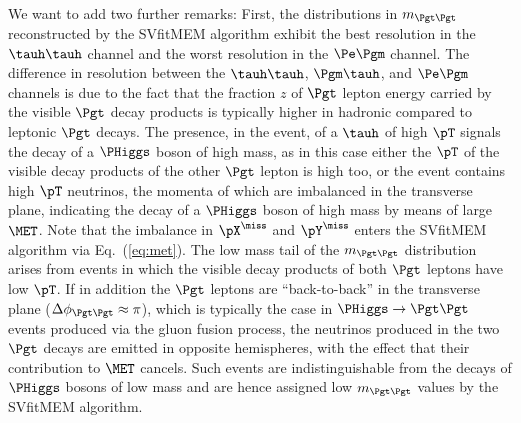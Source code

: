 We want to add two further remarks:
First, the distributions in $m_{\Pgt\Pgt}$ reconstructed by the SVfitMEM algorithm 
exhibit the best resolution in the $\tauh\tauh$ channel and the worst resolution in the $\Pe\Pgm$ channel.
The difference in resolution between the $\tauh\tauh$, $\Pgm\tauh$, and $\Pe\Pgm$ channels
is due to the fact that the fraction $z$ of $\Pgt$ lepton energy carried by the visible $\Pgt$ decay
products is typically higher in hadronic compared to leptonic $\Pgt$ decays.
The presence, in the event, of a $\tauh$ of high $\pT$ signals the decay of a
$\PHiggs$ boson of high mass,
as in this case either the $\pT$ of the visible decay products of the
other $\Pgt$ lepton is high too,
or the event contains high $\pT$ neutrinos, the momenta of which are imbalanced in the transverse plane,
indicating the decay of a $\PHiggs$ boson of high mass  by means of large $\MET$.
Note that the imbalance in $\pX^{\miss}$ and $\pY^{\miss}$ enters the SVfitMEM algorithm via Eq.~(\ref{eq:met}).
The low mass tail of the $m_{\Pgt\Pgt}$ distribution arises from events in which the visible decay products of both $\Pgt$ leptons have low $\pT$.
If in addition the $\Pgt$ leptons are ``back-to-back'' in the transverse plane ($\Delta\phi_{\Pgt\Pgt} \approx \pi$),
which is typically the case in $\PHiggs \to \Pgt\Pgt$ events produced via the gluon fusion process,
the neutrinos produced in the two $\Pgt$ decays are emitted in opposite hemispheres, 
with the effect that their contribution to $\MET$ cancels.
Such events are indistinguishable from the decays of $\PHiggs$ bosons of low mass
and are hence assigned low $m_{\Pgt\Pgt}$ values by the SVfitMEM algorithm.

